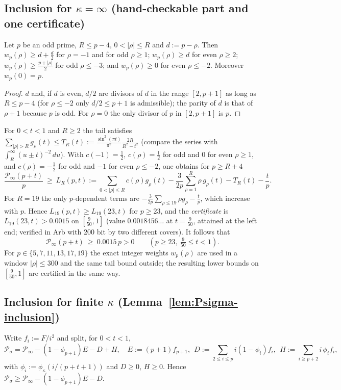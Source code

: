 \subsection{Inclusion for $\kappa=\infty$ (hand-checkable part and one certificate)}
\begin{lemma}\label{lem:guaranteed}
Let $p$ be an odd prime, $R\le p-4$, $0<|\rho|\le R$ and $d:=p-\rho$. Then $w_p(\rho)\ge d+\tfrac d2$ for $\rho=-1$ and for odd $\rho\ge1$; $w_p(\rho)\ge d$ for even $\rho\ge2$; $w_p(\rho)\ge\tfrac{p+|\rho|}{2}$ for odd $\rho\le-3$; and $w_p(\rho)\ge0$ for even $\rho\le-2$. Moreover $w_p(0)=p$.
\end{lemma}
\begin{proof}
$d$ and, if $d$ is even, $d/2$ are divisors of $d$ in the range $[2,p+1]$ as long as $R\le p-4$ (for $\rho\le-2$ only $d/2\le p+1$ is admissible); the parity of $d$ is that of $\rho+1$ because $p$ is odd. For $\rho=0$ the only divisor of $p$ in $[2,p+1]$ is $p$.
\end{proof}
For $0<t<1$ and $R\ge2$ the tail satisfies $\sum_{|\rho|>R}g_\rho(t)\le T_R(t):=\frac{\sin^2(\pi t)}{\pi^2}\frac{2R}{R^2-t^2}$ (compare the series with $\int_R^\infty(u\pm t)^{-2}\,du$). With $c(-1)=\tfrac12$, $c(\rho)=\tfrac12$ for odd and $0$ for even $\rho\ge1$, and $c(\rho)=-\tfrac12$ for odd and $-1$ for even $\rho\le-2$, one obtains for $p\ge R+4$
\begin{equation}\label{eq:LR}
\frac{\mathcal P_\infty(p+t)}{p}\ \ge\ L_R(p,t):=\sum_{0<|\rho|\le R}c(\rho)g_\rho(t)-\frac{3}{2p}\sum_{\rho=1}^{R}\rho\,g_\rho(t)-T_R(t)-\frac tp .
\end{equation}
For $R=19$ the only $p$-dependent terms are $-\tfrac3{2p}\sum_{\rho\le19}\rho g_\rho-\tfrac tp$, which increase with $p$. Hence $L_{19}(p,t)\ge L_{19}(23,t)$ for $p\ge23$, and the \emph{certificate} is $L_{19}(23,t)>0.0015$ on $[\tfrac{9}{50},1]$ (value $0.0018456\ldots$ at $t=\tfrac{9}{50}$, attained at the left end; verified in Arb with $200$ bit by two different covers). It follows that
\begin{equation}\label{eq:Pinf-incl}
\mathcal P_\infty(p+t)\ \ge\ 0.0015\,p>0\qquad(p\ge23,\ \tfrac9{50}\le t<1).
\end{equation}
For $p\in\{5,7,11,13,17,19\}$ the exact integer weights $w_p(\rho)$ are used in a window $|\rho|\le300$ and the same tail bound outside; the resulting lower bounds on $[\tfrac9{50},1]$ are certified in the same way.

\subsection{Inclusion for finite $\kappa$ (Lemma~\ref{lem:Psigma-inclusion})}\label{subsec:finite-kappa}
Write $f_i:=F/i^2$ and split, for $0<t<1$,
\[
\mathcal P_\sigma=\mathcal P_\infty-(1-\phi_{p+1})E-D+H,\quad
E:=(p+1)f_{p+1},\ \ D:=\sum_{2\le i\le p}i(1-\phi_i)f_i,\ \ H:=\sum_{i\ge p+2}i\,\phi_if_i,
\]
with $\phi_i:=\phi_\kappa(i/(p+t+1))$ and $D\ge0$, $H\ge0$. Hence $\mathcal P_\sigma\ge\mathcal P_\infty-(1-\phi_{p+1})E-D$.

